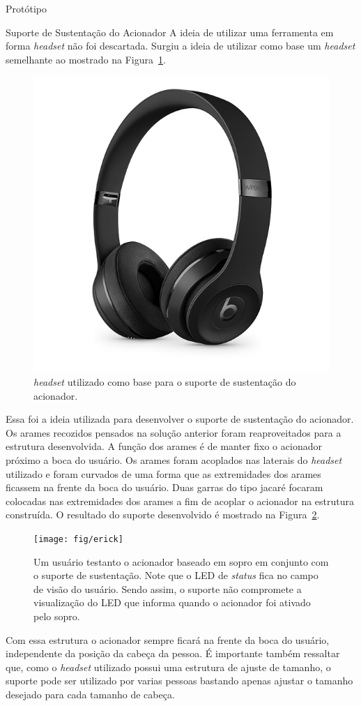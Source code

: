 \begin{chapter}{Protótipo}
\begin{section}{Suporte de Sustentação do Acionador}
A ideia de utilizar uma ferramenta em forma \textit{headset} não foi descartada.
Surgiu a ideia de utilizar como base um \textit{headset} semelhante ao mostrado 
na Figura~\ref{fig:fone}. 
 
\begin{figure}[!h]
	\centering
	\begin{minipage}[c]{\textwidth}
	\centering
	\includegraphics[width=0.4\linewidth]{fig/fone}
	\caption{\textit{headset} utilizado como base para o suporte de sustentação
do acionador.}
	\label{fig:fone}
	\end{minipage}
\end{figure}


Essa foi a ideia utilizada para desenvolver o suporte de sustentação do
acionador. Os arames recozidos pensados na solução anterior foram reaproveitados
para a estrutura desenvolvida. A função dos arames é de manter fixo o acionador
próximo a boca do usuário. Os arames foram acoplados nas laterais do
\textit{headset} utilizado e foram curvados de uma forma que as extremidades
dos arames ficassem na frente da boca do usuário. Duas garras do tipo jacaré
focaram colocadas nas extremidades  dos arames a fim de acoplar o acionador na
estrutura construída. O resultado do suporte desenvolvido é mostrado na
Figura~\ref{fig:suporte}. 

\begin{figure}[!h]
	\centering
	\begin{minipage}[c]{\textwidth}
	\centering
	\texttt{[image: fig/erick]}
	\caption{Um usuário testanto o acionador baseado em sopro em conjunto com o
suporte de sustentação. Note que o LED de \textit{status} fica no campo de visão
do usuário. Sendo assim, o suporte não compromete a visualização do LED que
informa quando o acionador foi ativado pelo sopro.}
	\label{fig:suporte}
	\end{minipage}
\end{figure}



Com essa estrutura o acionador sempre ficará na frente da boca do usuário,
independente da posição da cabeça da pessoa. É importante também ressaltar que,
como o \textit{headset} utilizado possui uma estrutura de ajuste de tamanho, o
suporte pode ser utilizado por varias pessoas bastando apenas ajustar o tamanho
desejado para cada tamanho de cabeça. 


\end{section}
\end{chapter}
